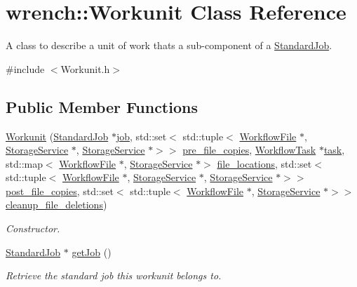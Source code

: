 \hypertarget{classwrench_1_1_workunit}{}\section{wrench\+:\+:Workunit Class Reference}
\label{classwrench_1_1_workunit}


A class to describe a unit of work that\textquotesingle{}s a sub-\/component of a \hyperlink{classwrench_1_1_standard_job}{Standard\+Job}.  




{\ttfamily \#include $<$Workunit.\+h$>$}

\subsection*{Public Member Functions}
\begin{DoxyCompactItemize}
\item 
\hyperlink{classwrench_1_1_workunit_a91afa9973889dd717d7ee6428ce8d697}{Workunit} (\hyperlink{classwrench_1_1_standard_job}{Standard\+Job} $\ast$\hyperlink{classwrench_1_1_workunit_a2264928b16909aad8408251ce44cafb7}{job}, std\+::set$<$ std\+::tuple$<$ \hyperlink{classwrench_1_1_workflow_file}{Workflow\+File} $\ast$, \hyperlink{classwrench_1_1_storage_service}{Storage\+Service} $\ast$, \hyperlink{classwrench_1_1_storage_service}{Storage\+Service} $\ast$$>$$>$ \hyperlink{classwrench_1_1_workunit_a6010b01e695180b8b38cc8cf2670a19c}{pre\+\_\+file\+\_\+copies}, \hyperlink{classwrench_1_1_workflow_task}{Workflow\+Task} $\ast$\hyperlink{classwrench_1_1_workunit_a7639e2dcd02bff9f64682279305a7f6a}{task}, std\+::map$<$ \hyperlink{classwrench_1_1_workflow_file}{Workflow\+File} $\ast$, \hyperlink{classwrench_1_1_storage_service}{Storage\+Service} $\ast$$>$ \hyperlink{classwrench_1_1_workunit_a612ab0529438becbfe6919458de795ae}{file\+\_\+locations}, std\+::set$<$ std\+::tuple$<$ \hyperlink{classwrench_1_1_workflow_file}{Workflow\+File} $\ast$, \hyperlink{classwrench_1_1_storage_service}{Storage\+Service} $\ast$, \hyperlink{classwrench_1_1_storage_service}{Storage\+Service} $\ast$$>$$>$ \hyperlink{classwrench_1_1_workunit_a0bd150508109344de5da6284f591a83d}{post\+\_\+file\+\_\+copies}, std\+::set$<$ std\+::tuple$<$ \hyperlink{classwrench_1_1_workflow_file}{Workflow\+File} $\ast$, \hyperlink{classwrench_1_1_storage_service}{Storage\+Service} $\ast$$>$$>$ \hyperlink{classwrench_1_1_workunit_a65f7cd5374d51a809c89319d8d9895ed}{cleanup\+\_\+file\+\_\+deletions})
\begin{DoxyCompactList}\small\item\em Constructor. \end{DoxyCompactList}\item 
\hyperlink{classwrench_1_1_standard_job}{Standard\+Job} $\ast$ \hyperlink{classwrench_1_1_workunit_a84e73108e9516bf7abfb6c136ef8bbc1}{get\+Job} ()
\begin{DoxyCompactList}\small\item\em Retrieve the standard job this workunit belongs to. \end{DoxyCompactList}\end{DoxyCompactItemize}
